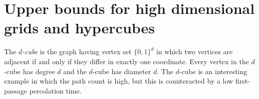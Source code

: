 \documentclass{patmorin}
\begin{document}
%
%

\section{Upper bounds for high dimensional grids and hypercubes}
The \emph{$d$-cube} is the graph having vertex set $\{0,1\}^d$ in
which two vertices are adjacent if and only if they differ in exactly
one coordinate.  Every vertex in the $d$-cube has degree $d$ and the
$d$-cube has diameter $d$.  The $d$-cube is an interesting example
in which the path count is high, but this is counteracted by a low
first-passage percolation time.
\end{document}
